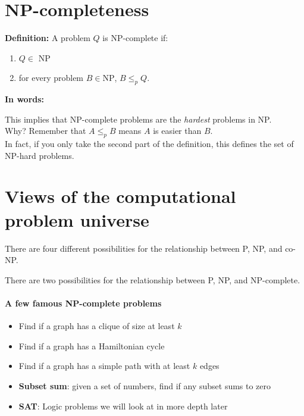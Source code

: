 \documentclass[11  pt]{article}
\begin{document}
\newpage


\section{NP-completeness}

\textbf{Definition: } A problem $Q$ is NP-complete if:
\begin{enumerate}
	\item $Q \in$ NP
	\item for every problem $B \in \text{NP}$, $B \leq_p Q$. \\
\end{enumerate}

\textbf{In words:} \\ %


\vs{8cm}

This implies that NP-complete problems are the \emph{hardest} problems in NP. \\


Why? Remember that $A \leq_p B$ means $A$ is easier than $B$. \\

In fact, if you only take the second part of the definition, this defines the set of NP-hard problems.

	
\section{Views of the computational problem universe}
	There are four different possibilities for the relationship between P, NP, and co-NP.
	
	
	
	\vfill
	
	There are two possibilities for the relationship between P, NP, and NP-complete.
	
	\vfill
	
	\newpage
	
	\paragraph{A few famous NP-complete problems}
	\begin{itemize}
		\item Find if a graph has a clique of size at least $k$
		\item Find if a graph has a Hamiltonian cycle
		\item Find if a graph has a simple path with at least $k$ edges
		\item \textbf{Subset sum}: given a set of numbers, find if any subset sums to zero
		\item \textbf{SAT}: Logic problems we will look at in more depth later
	\end{itemize}
	
\end{document}
